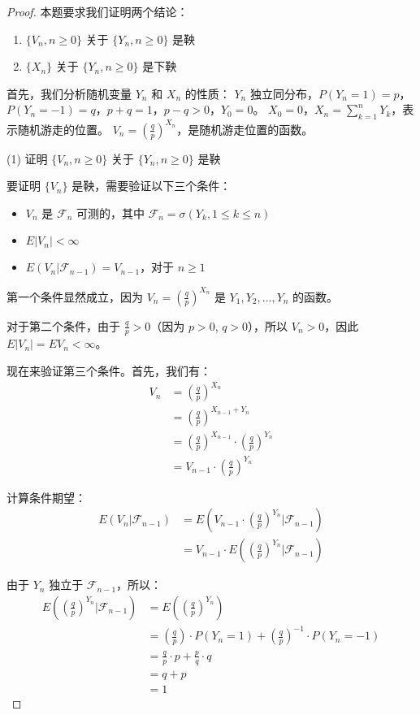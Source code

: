 \documentclass[lang=cn,10pt,thmcnt=section]{elegantbook}
\begin{document}
\begin{proof}
	本题要求我们证明两个结论：
\begin{enumerate}
    \item $\{V_n, n \geq 0\}$ 关于 $\{Y_n, n \geq 0\}$ 是鞅
    \item $\{X_n\}$ 关于 $\{Y_n, n \geq 0\}$ 是下鞅
\end{enumerate}

首先，我们分析随机变量 $Y_n$ 和 $X_n$ 的性质：
$Y_n$ 独立同分布，$P(Y_n = 1) = p$，$P(Y_n = -1) = q$，$p + q = 1$，$p - q > 0$，$Y_0 = 0$。
$X_0 = 0$，$X_n = \sum_{k=1}^{n} Y_k$，表示随机游走的位置。
$V_n = \left(\frac{q}{p}\right)^{X_n}$，是随机游走位置的函数。

(1) 证明 $\{V_n, n \geq 0\}$ 关于 $\{Y_n, n \geq 0\}$ 是鞅

要证明 $\{V_n\}$ 是鞅，需要验证以下三个条件：
\begin{itemize}
    \item $V_n$ 是 $\mathcal{F}_n$ 可测的，其中 $\mathcal{F}_n = \sigma(Y_k, 1 \leq k \leq n)$
    \item $E|V_n| < \infty$
    \item $E(V_n|\mathcal{F}_{n-1}) = V_{n-1}$，对于 $n \geq 1$
\end{itemize}

第一个条件显然成立，因为 $V_n = \left(\frac{q}{p}\right)^{X_n}$ 是 $Y_1, Y_2, \ldots, Y_n$ 的函数。

对于第二个条件，由于 $\frac{q}{p} > 0$（因为 $p > 0$, $q > 0$），所以 $V_n > 0$，因此 $E|V_n| = EV_n < \infty$。

现在来验证第三个条件。首先，我们有：
\begin{align}
V_n &= \left(\frac{q}{p}\right)^{X_n} \\
&= \left(\frac{q}{p}\right)^{X_{n-1} + Y_n} \\
&= \left(\frac{q}{p}\right)^{X_{n-1}} \cdot \left(\frac{q}{p}\right)^{Y_n} \\
&= V_{n-1} \cdot \left(\frac{q}{p}\right)^{Y_n}
\end{align}

计算条件期望：
\begin{align}
E(V_n|\mathcal{F}_{n-1}) &= E\left(V_{n-1} \cdot \left(\frac{q}{p}\right)^{Y_n} | \mathcal{F}_{n-1}\right) \\
&= V_{n-1} \cdot E\left(\left(\frac{q}{p}\right)^{Y_n} | \mathcal{F}_{n-1}\right)
\end{align}

由于 $Y_n$ 独立于 $\mathcal{F}_{n-1}$，所以：
\begin{align}
E\left(\left(\frac{q}{p}\right)^{Y_n} | \mathcal{F}_{n-1}\right) &= E\left(\left(\frac{q}{p}\right)^{Y_n}\right) \\
&= \left(\frac{q}{p}\right) \cdot P(Y_n = 1) + \left(\frac{q}{p}\right)^{-1} \cdot P(Y_n = -1) \\
&= \frac{q}{p} \cdot p + \frac{p}{q} \cdot q \\
&= q + p \\
&= 1
\end{align}


\end{proof}
\end{document}
